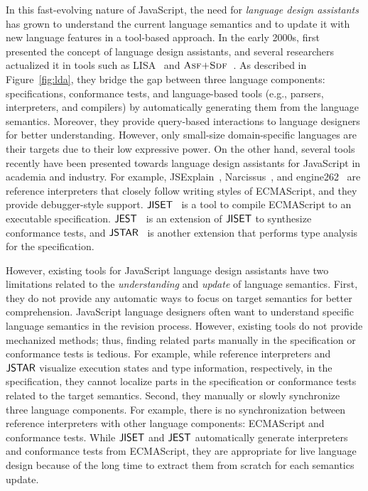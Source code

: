 In this fast-evolving nature of JavaScript, the need for \textit{language design
assistants} has grown to understand the current language semantics and to update
it with new language features in a tool-based approach. In the early 2000s,
\citet{lda} first presented the concept of language design assistants, and
several researchers actualized it in tools such as LISA~\cite{lisa} and
$\textsc{Asf+Sdf}$~\cite{asf-sdf, meta-env}. As described in Figure~\ref{fig:lda}, they
bridge the gap between three language components: specifications, conformance
tests, and language-based tools (e.g., parsers, interpreters, and compilers) by
automatically generating them from the language semantics. Moreover, they
provide query-based interactions to language designers for better understanding.
However, only small-size domain-specific languages are their targets due to
their low expressive power. On the other hand, several tools recently have been
presented towards language design assistants for JavaScript in academia and
industry. For example, JSExplain~\cite{jsexplain}, Narcissus~\cite{narcissus},
and engine262~\cite{engine262} are reference interpreters that closely follow
writing styles of ECMAScript, and they provide debugger-style support.
$\textsf{JISET}$~\cite{jiset} is a tool to compile ECMAScript to an executable
specification. $\textsf{JEST}$~\cite{jest} is an extension of $\textsf{JISET}$ to synthesize
conformance tests, and $\textsf{JSTAR}$~\cite{jstar} is another extension that performs
type analysis for the specification.

However, existing tools for JavaScript language design assistants have two
limitations related to the \textit{understanding} and \textit{update} of
language semantics. First, they do not provide any automatic ways to focus on
target semantics for better comprehension. JavaScript language designers often
want to understand specific language semantics in the revision process. However,
existing tools do not provide mechanized methods; thus, finding related parts
manually in the specification or conformance tests is tedious. For example,
while reference interpreters and $\textsf{JSTAR}$ visualize execution states and type
information, respectively, in the specification, they cannot localize parts in
the specification or conformance tests related to the target semantics. Second,
they manually or slowly synchronize three language components. For example,
there is no synchronization between reference interpreters with other language
components: ECMAScript and conformance tests. While $\textsf{JISET}$ and $\textsf{JEST}$
automatically generate interpreters and conformance tests from ECMAScript, they
are appropriate for live language design because of the long time to extract
them from scratch for each semantics update.

